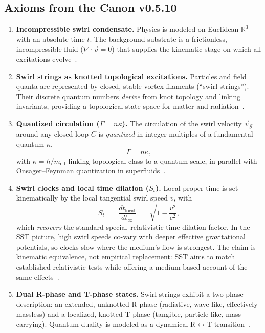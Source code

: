 \documentclass[10pt,reprint,aps,onecolumn,nofootinbib]{revtex4-2}
\begin{document}
    \subsection*{Axioms from the Canon v0.5.10}
        \begin{enumerate}
        \item \textbf{Incompressible swirl condensate.} Physics is modeled on Euclidean $\mathbb{R}^3$ with an absolute time $t$. The background substrate is a frictionless, incompressible fluid ($\nabla \cdot \vec{v}=0$) that supplies the kinematic stage on which all excitations evolve~\cite{1}.

        \item \textbf{Swirl strings as knotted topological excitations.} Particles and field quanta are represented by closed, stable vortex filaments (``swirl strings''). Their discrete quantum numbers \emph{derive} from knot topology and linking invariants, providing a topological state space for matter and radiation~\cite{1}.

        \item \textbf{Quantized circulation ($\Gamma=n\kappa$).} The circulation of the swirl velocity $\vec{v}_\mathcal{G}$ around any closed loop $C$ is \emph{quantized} in integer multiples of a fundamental quantum $\kappa$,
        \[
            \Gamma = n\kappa,
        \]
        with $\kappa=h/m_{\mathrm{eff}}$ linking topological class to a quantum scale, in parallel with Onsager–Feynman quantization in superfluids~\cite{1}.

        \item \textbf{Swirl clocks and local time dilation ($S_t$).} Local proper time is set kinematically by the local tangential swirl speed $v$, with
        \begin{equation}
        S_t \;=\; \frac{dt_\text{local}}{dt_\infty} \;=\; \sqrt{1-\frac{v^2}{c^2}},
        \label{eq:swirlclock}
        \end{equation}
        which \emph{recovers} the standard special–relativistic time-dilation factor. In the SST picture, high swirl speeds co-vary with deeper effective gravitational potentials, so clocks slow where the medium’s flow is strongest. The claim is kinematic equivalence, not empirical replacement: SST aims to match established relativistic tests while offering a medium-based account of the same effects~\cite{1}.

        \item \textbf{Dual R-phase and T-phase states.} Swirl strings exhibit a two-phase description: an extended, unknotted R-phase (radiative, wave-like, effectively massless) and a localized, knotted T-phase (tangible, particle-like, mass-carrying). Quantum duality is modeled as a dynamical R$\leftrightarrow$T transition~\cite{1}.


\end{enumerate}
\end{document}
